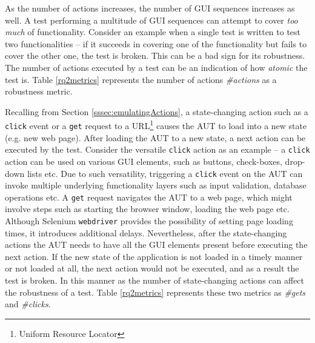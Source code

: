 As the number of actions increases, the number of GUI sequences increases as well. A test performing a multitude of GUI sequences can attempt to cover \textit{too much} of functionality. Consider an example when a single test is written to test two functionalities -- if it succeeds in covering one of the functionality but fails to cover the other one, the test is broken. This can be a bad sign for its robustness. 
The number of actions executed by a test can be an indication of how \textit{atomic} the test is. Table \ref{rq2metrics} represents the number of actions \textit{\#actions} as a robustness metric. 

Recalling from Section \ref{sssec:emulatingActions}, a state-changing action such as a \texttt{click} event or a \texttt{get} request to a URL\footnote{Uniform Resource Locator} causes the AUT to load into a new state (e.g. new web page). After loading the AUT to a new state, a next action can be executed by the test. Consider the versatile \texttt{click} action as an example -- a \texttt{click} action can be used on various GUI elements, such as buttons, check-boxes, drop-down lists etc. Due to such versatility, triggering a \texttt{click} event on the AUT can invoke multiple underlying functionality layers such as input validation, database operations etc. A \texttt{get} request navigates the AUT to a web page, which might involve steps such as starting the browser window, loading the web page etc. Although Selenium \texttt{webdriver} provides the possibility of setting page loading times, it introduces additional delays. Nevertheless, after the state-changing actions the AUT needs to have all the GUI elements present before executing the next action. If the new state of the application is not loaded in a timely manner or not loaded at all, the next action would not be executed, and as a result the test is broken. In this manner as the number of state-changing actions can affect the robustness of a test. Table \ref{rq2metrics} represents these two metrics as \textit{\#gets} and \textit{\#clicks}.

